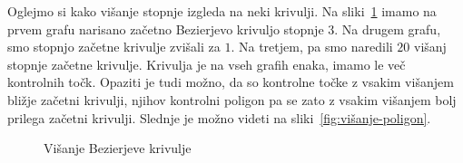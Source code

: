 \documentclass[isrm2, tisk]{fmfdelo}
\begin{document}
    Oglejmo si kako višanje stopnje izgleda na neki krivulji.
    Na sliki~\ref{fig:višanje} imamo na prvem grafu narisano začetno Bezierjevo krivuljo stopnje $3$.
    Na drugem grafu, smo stopnjo začetne krivulje zvišali za $1$.
    Na tretjem, pa smo naredili $20$ višanj stopnje začetne krivulje.
    Krivulja je na vseh grafih enaka, imamo le več kontrolnih točk.
    Opaziti je tudi možno, da so kontrolne točke z vsakim višanjem bližje začetni krivulji, njihov kontrolni poligon pa se zato z vsakim višanjem bolj prilega začetni krivulji.
    Slednje je možno videti na sliki~\ref{fig:višanje-poligon}.


    \begin{figure}[h]
        \centering
        \qquad
        \qquad
        \caption{Višanje Bezierjeve krivulje}
        \label{fig:višanje}
    \end{figure}
\end{document}
